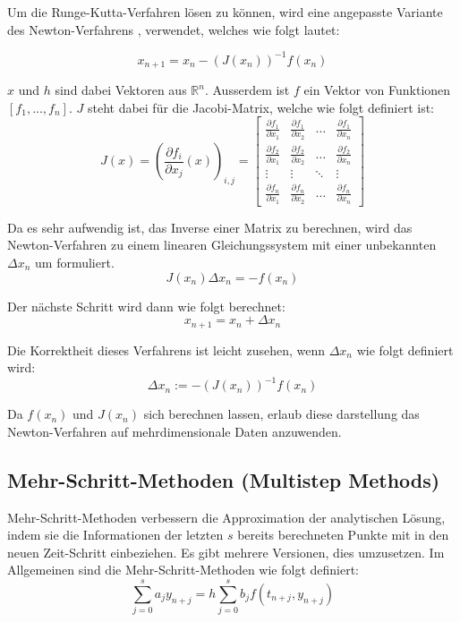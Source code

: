 Um die Runge-Kutta-Verfahren lösen zu können, 
wird eine angepasste Variante des Newton-Verfahrens \cite[Kaptitel~5.1]{intorduction_to_numerical_analysis}, 
verwendet, welches wie folgt lautet:

$$
x_{n+1} = x_n - (J(x_n))^{-1} f(x_n)
$$

$x$ und $h$ sind dabei Vektoren aus $\mathbb{R}^n$. 
Ausserdem ist $f$ ein Vektor von Funktionen $[f_1, ..., f_n]$.
$J$ steht dabei für die Jacobi-Matrix, welche wie folgt definiert ist:
$$
J(x) = \left( \frac{\partial f_i}{\partial x_j}(x) \right)_{i, j} = \begin{bmatrix}
\frac{\partial f_1}{\partial x_1} & \frac{\partial f_1}{\partial x_2} & \dots & \frac{\partial f_1}{\partial x_n} \\
\frac{\partial f_2}{\partial x_1} & \frac{\partial f_2}{\partial x_2} & \dots & \frac{\partial f_2}{\partial x_n} \\
\vdots & \vdots & \ddots & \vdots \\
\frac{\partial f_n}{\partial x_1} & \frac{\partial f_n}{\partial x_2} & \dots & \frac{\partial f_n}{\partial x_n}
\end{bmatrix}
$$

Da es sehr aufwendig ist, das Inverse einer Matrix zu berechnen, wird das Newton-Verfahren zu einem linearen Gleichungssystem mit einer unbekannten $\Delta x_n$ um formuliert.
$$
J(x_n) \Delta x_n = -f(x_n)
$$

Der nächste Schritt wird dann wie folgt berechnet:
$$
x_{n+1} = x_n + \Delta x_n
$$

Die Korrektheit dieses Verfahrens ist leicht zusehen, wenn $\Delta x_n $
wie folgt definiert wird:
$$
\Delta x_n := -(J(x_n))^{-1} f(x_n)
$$

Da $f(x_n)$ und $J(x_n)$ sich berechnen lassen, 
erlaub diese darstellung das Newton-Verfahren auf mehrdimensionale Daten anzuwenden. 


\subsection{Mehr-Schritt-Methoden (Multistep Methods)} \label{sec:multi_step}

Mehr-Schritt-Methoden \cite[Kapitel~III.1]{ode1} verbessern die Approximation der analytischen Lösung, indem sie 
die Informationen der letzten $s$ bereits berechneten Punkte mit in den neuen Zeit-Schritt einbeziehen.
Es gibt mehrere Versionen, dies umzusetzen.
Im Allgemeinen sind die Mehr-Schritt-Methoden wie folgt definiert:
$$
\sum_{j= 0}^{s} a_j y_{n+j} = h \sum_{j=0}^s b_j f(t_{n+j}, y_{n+j})
$$

